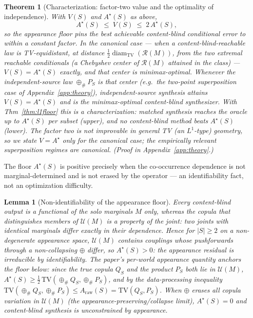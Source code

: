 \documentclass[11pt]{article}
\newtheorem{theorem}{Theorem}
\newtheorem{lemma}{Lemma}
\begin{document}
\begin{theorem}[Characterization: factor-two value and the optimality of independence]\label{thm:l2char}
With $V(S)$ and $A^\star(S)$ as above,
\[
A^\star(S)\;\le\;V(S)\;\le\;2\,A^\star(S),
\]
so the appearance floor pins the best achievable content-blind conditional error to within a
constant factor. In the \emph{canonical} case --- when a content-blind-reachable law is
TV-equidistant, at distance $\tfrac12\operatorname{diam}_{\mathrm{TV}}(\mathcal R(M))$, from the two
extremal reachable conditionals (a Chebyshev center of $\mathcal R(M)$ attained in the class) ---
$V(S)=A^\star(S)$ exactly, and that center is minimax-optimal. Whenever the independent-source law
$\oplus_{\#}P_S$ is that center (e.g.\ the two-point superposition case of
Appendix~\ref{app:theory}), \emph{independent-source synthesis} attains $V(S)=A^\star(S)$ and is
the minimax-optimal content-blind synthesizer. With Thm~\ref{thm:l1floor} this is a
characterization: matched synthesis reaches the oracle up to $A^\star(S)$ per subset (upper), and
no content-blind method beats $A^\star(S)$ (lower). The factor two is not improvable in general TV
(an $L^1$-type) geometry, so we state $V=A^\star$ only for the canonical case; the empirically
relevant superposition regimes are canonical. (Proof in Appendix~\ref{app:theory}.)
\end{theorem}

The floor $A^\star(S)$ is positive precisely when the co-occurrence dependence is not
marginal-determined and is not erased by the operator --- an identifiability fact, not an
optimization difficulty.

\begin{lemma}[Non-identifiability of the appearance floor]\label{lem:floor}
Every content-blind output is a functional of the solo \emph{marginals} $M$ only, whereas the
copula that distinguishes members of $\mathcal U(M)$ is a property of the \emph{joint}: two joints
with identical marginals differ exactly in their dependence. Hence for $|S|\ge2$ on a
non-degenerate appearance space, $\mathcal U(M)$ contains couplings whose pushforwards through a
non-collapsing $\oplus$ differ, so $A^\star(S)>0$: the appearance residual is irreducible by
\emph{identifiability}. The paper's per-world appearance quantity anchors the floor below: since
the true copula $Q_S$ and the product $P_S$ both lie in $\mathcal U(M)$,
$A^\star(S)\ge\tfrac12\,\mathrm{TV}(\oplus_{\#}Q_S,\oplus_{\#}P_S)$, and by the data-processing
inequality $\mathrm{TV}(\oplus_{\#}Q_S,\oplus_{\#}P_S)\le A_{\mathrm{raw}}(S)=\mathrm{TV}(Q_S,P_S)$.
When $\oplus$ erases all copula variation in $\mathcal U(M)$ (the appearance-preserving/collapse
limit), $A^\star(S)=0$ and content-blind synthesis is unconstrained by appearance.
\end{lemma}
\end{document}
